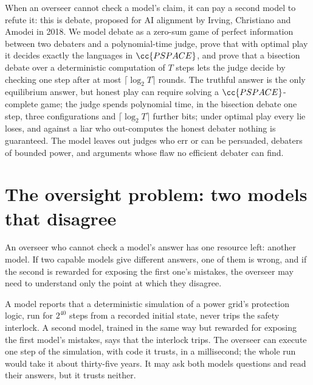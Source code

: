 \newcommand{\debateclass}{\cc{DEBATE}}
\newcommand{\debateL}{\textsf{left}}
\newcommand{\debateR}{\textsf{right}}

\begin{refsection}

\begin{chaptersummary}
When an overseer cannot check a model's claim, it can pay a second model to refute it: this is debate, proposed for AI alignment by Irving, Christiano and Amodei in 2018. We model debate as a zero-sum game of perfect information between two debaters and a polynomial-time judge, prove that with optimal play it decides exactly the languages in $\cc{PSPACE}$, and prove that a bisection debate over a deterministic computation of $T$ steps lets the judge decide by checking one step after at most $\lceil\log_2T\rceil$ rounds. The truthful answer is the only equilibrium answer, but honest play can require solving a $\cc{PSPACE}$-complete game; the judge spends polynomial time, in the bisection debate one step, three configurations and $\lceil\log_2T\rceil$ further bits; under optimal play every lie loses, and against a liar who out-computes the honest debater nothing is guaranteed. The model leaves out judges who err or can be persuaded, debaters of bounded power, and arguments whose flaw no efficient debater can find.
\end{chaptersummary}

\section{The oversight problem: two models that disagree}\label{sec:debate:problem}

An overseer who cannot check a model's answer has one resource left: another model. If two capable models give different answers, one of them is wrong, and if the second is rewarded for exposing the first one's mistakes, the overseer may need to understand only the point at which they disagree.

\begin{oversight}
A model reports that a deterministic simulation of a power grid's protection logic, run for $2^{40}$ steps from a recorded initial state, never trips the safety interlock. A second model, trained in the same way but rewarded for exposing the first model's mistakes, says that the interlock trips. The overseer can execute one step of the simulation, with code it trusts, in a millisecond; the whole run would take it about thirty-five years. It may ask both models questions and read their answers, but it trusts neither.
\end{oversight}


\end{refsection}
